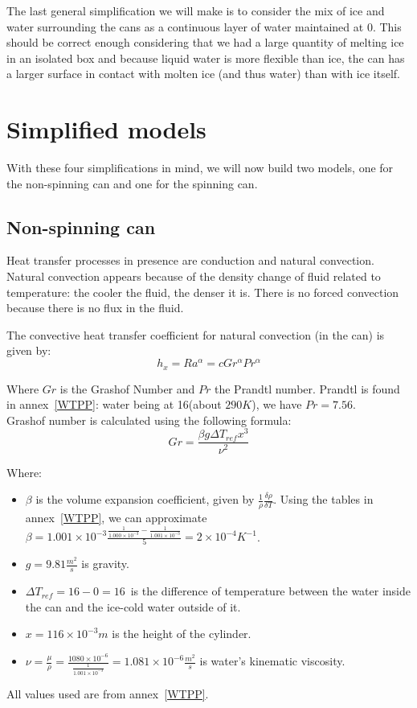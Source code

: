 \documentclass{report}
\begin{document}
	The last general simplification we will make is to consider the mix of ice and water surrounding the cans as a continuous layer of water maintained at 0\textcelsius. This should be correct enough considering that we had a large quantity of melting ice in an isolated box and because liquid water is more flexible than ice, the can has a larger surface in contact with molten ice (and thus water) than with ice itself.
	
	
	\section{Simplified models}\label{sm}
	
	With these four simplifications in mind, we will now build two models, one for the non-spinning can and one for the spinning can.
	
	\subsection{Non-spinning can}\label{nrc}
	
	Heat transfer processes in presence are conduction and natural convection. Natural convection appears because of the density change of fluid related to temperature: the cooler the fluid, the denser it is. There is no forced convection because there is no flux in the fluid.
	
	The convective heat transfer coefficient for natural convection (in the can) is given by:
	\begin{equation}
		h_x=Ra^\alpha = cGr^\alpha Pr^\alpha
	\end{equation}
	
	Where $Gr$ is the Grashof Number and $Pr$ the Prandtl number. Prandtl is found in annex~\ref{WTPP}: water being at 16\textcelsius (about $290K$), we have $Pr=7.56$.\\
	Grashof number is calculated using the following formula:
	\begin{equation}
	Gr=\frac{\beta g \Delta T_{ref} x^3}{\nu^2}
	\end{equation}
	
	Where:
	\begin{itemize}
		\item $\beta$ is the volume expansion coefficient, given by $\frac{1}{\rho}\frac{\delta\rho}{\delta T}$. Using the tables in annex~\ref{WTPP}, we can approximate $\beta=1.001\times 10^{-3}\frac{\frac{1}{1.000\times 10^{-3}}-\frac{1}{1.001\times 10^{-3}}}{5}=2\times 10^{-4} K^{-1}$.
		\item $g=9.81\frac{m^2}{s}$ is gravity.
		\item $\Delta T_{ref}=16-0=16$\textcelsius\ is the difference of temperature between the water inside the can and the ice-cold water outside of it.
		\item $x=116\times 10^{-3}m$ is the height of the cylinder.
		\item $\nu=\frac{\mu}{\rho}=\frac{1080\times 10^{-6}}{\frac{1}{1.001\times 10^{-3}}}=1.081\times 10^{-6}\frac{m^2}{s}$ is water's kinematic viscosity.
	\end{itemize}
	All values used are from annex~\ref{WTPP}.
	
\end{document}
